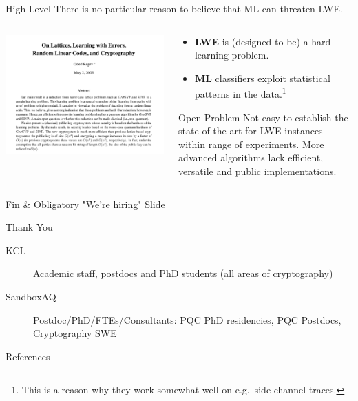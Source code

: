 \documentclass[table,10pt,aspectratio=169]{beamer}
\begin{document}
\begin{frame}[label={sec:orge3b2fa7}]{High-Level}
There is no particular reason to believe that ML can threaten LWE.

\begin{columns}
\begin{column}{0.6\columnwidth}
\begin{center}
\includegraphics[width=.9\linewidth]{./regev-hard-learning-problems.png}
\end{center}
\end{column}


\begin{column}{0.4\columnwidth}
\begin{itemize}
\item \textbf{LWE} is (designed to be) a hard learning problem.
\item \textbf{ML} classifiers exploit statistical patterns in the data.\footnote{This is a reason why they work somewhat well on e.g. side-channel traces.}
\end{itemize}

\begin{alertblock}{Open Problem}
Not easy to establish the state of the art for LWE instances within range of experiments. More advanced algorithms lack efficient, versatile and public implementations.
\end{alertblock}
\end{column}
\end{columns}
\end{frame}

\begin{frame}[label={sec:org6045ec4},standout]{Fin \& Obligatory "We're hiring" Slide}
\begin{center}
\Huge \alert{Thank You}
\end{center}

\begin{description}
\item[{KCL}] Academic staff, postdocs and PhD students (all areas of cryptography)
\item[{SandboxAQ}] Postdoc/PhD/FTEs/Consultants: PQC PhD residencies, PQC Postdocs, Cryptography SWE
\end{description}
\end{frame}

\begin{frame}[allowframebreaks]{References}
\renewcommand*{\bibfont}{\scriptsize}
\printbibliography[heading=none]
\end{frame}
\end{document}
